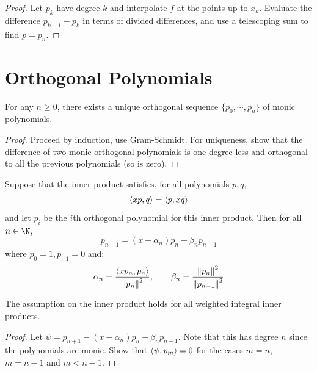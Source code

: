 \documentclass[../Main.tex]{subfiles}
\begin{document}
\begin{proof}
    Let $p_k$ have degree $k$ and interpolate $f$ at the points up to $x_k$. Evaluate the difference $p_{k+1} - p_k$ in terms of divided differences, and use a telescoping sum to find $p = p_n$.
\end{proof}
\section{Orthogonal Polynomials}
\begin{theorem}
    For any $n \geq 0$, there exists a unique orthogonal sequence $\{p_0, \cdots, p_n\}$ of monic polynomials.
    \label{thmOrthoPoly}
\end{theorem}
\begin{proof}
    Proceed by induction, use Gram-Schmidt. For uniqueness, show that the difference of two monic orthogonal polynomials is one degree less and orthogonal to all the previous polynomials (so is zero).
\end{proof}
\begin{theorem}
    Suppose that the inner product satisfies, for all polynomials $p, q$,
    \begin{equation*}
        \langle xp,q\rangle = \langle p,xq\rangle
    \end{equation*}
    and let $p_i$ be the $i$th orthogonal polynomial for this inner product. Then for all $n \in \N$,
    \begin{equation*}
        p_{n+1} = (x - \alpha_n)p_n - \beta_n p_{n-1}
    \end{equation*}
    where $p_0 = 1, p_{-1} = 0$ and:
    \begin{equation*}
        \alpha_n = \frac{\langle xp_n,p_n\rangle}{\left\|p_n\right\|^2},\qquad \beta_n = \frac{\left\|p_n\right\|^2}{\left\|p_{n-1}\right\|^2}
    \end{equation*}
    \label{thmThreeTermRecur}
\end{theorem}
\begin{remark}
    The assumption on the inner product holds for all weighted integral inner products.
\end{remark}
\begin{proof}
    Let $\psi = p_{n+1} - (x - \alpha_n) p_n + \beta_n p_{n-1}$. Note that this has degree $n$ since the polynomials are monic. Show that $\langle\psi,p_m\rangle = 0$ for the cases $m = n$, $m = n-1$ and $m < n-1$.
\end{proof}
\end{document}
